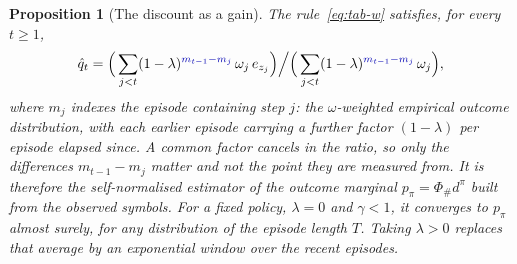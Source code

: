 \documentclass[11pt]{article}
\newtheorem{proposition}{Proposition}
\theoremstyle{remark}
\newcommand{\1}{\mathds{1}}
\newcommand{\occ}{d^{\pi}}
\newcommand{\push}{\Phi_{\#}}
\newcommand{\pz}{p_{\pi}}
\newcommand{\new}[1]{\textcolor{blue!70!black}{#1}}
\begin{document}
\begin{proposition}[The discount as a gain]
\label{prop:disc-step}
The rule~\eqref{eq:tab-w} satisfies, for every $t\ge1$,
\begin{equation}
  \hat q_t=\Big(\sum_{j<t}(1-\lambda)^{\new{m_{t-1}-m_j}}\,\omega_j\,e_{z_j}\Big)\Big/\Big(\sum_{j<t}(1-\lambda)^{\new{m_{t-1}-m_j}}\,\omega_j\Big),
  \label{eq:tab-disc}
\end{equation}
where \new{$m_j$} indexes the episode containing step $j$: the $\omega$-weighted empirical outcome distribution, with each earlier episode carrying a further factor $(1-\lambda)$ per episode elapsed since.
\new{A common factor cancels in the ratio, so only the differences $m_{t-1}-m_j$ matter and not the point they are measured from.}
\new{It is therefore the self-normalised estimator of the outcome marginal $\pz=\push\occ$ built from the observed symbols.
For a fixed policy, $\lambda=0$ and \new{$\gamma<1$}, it converges to $\pz$ almost surely, for any distribution of the episode length $T$.
Taking $\lambda>0$ replaces that average by an exponential window over the recent episodes.}
\end{proposition}
\end{document}
